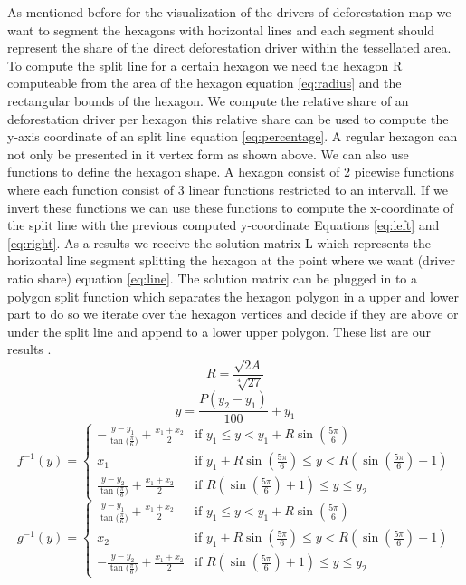 		As mentioned before for the visualization of the drivers of deforestation map we want to segment the hexagons with horizontal lines and each segment should represent the share of the direct deforestation driver within the tessellated area. To compute the split line for a certain hexagon we need the hexagon R computeable from the area of the hexagon equation \ref{eq:radius} and the rectangular bounds of the hexagon. We compute the relative share of an deforestation driver per hexagon this relative share can be used to compute the y-axis coordinate of an split line equation \ref{eq:percentage}. A regular hexagon can not only be presented in it vertex form as shown above. We can also use functions to define the hexagon shape. A hexagon consist of 2 picewise functions where each function consist of 3 linear functions restricted to an intervall. If we invert these functions we can use these functions to compute the x-coordinate of the split line with the previous computed y-coordinate Equations \ref{eq:left} and \ref{eq:right}. As a results we receive the solution matrix L which represents the horizontal line segment splitting the hexagon at the point where we want (driver ratio share) equation \ref{eq:line}. The solution matrix can be plugged in to a polygon split function which separates the hexagon polygon in a upper and lower part to do so we iterate over the hexagon vertices and decide if they are above or under the split line and append to a lower upper polygon. These list are our results .
		\begin{equation}
		\label{eq:radius}
			R = \frac{\sqrt{2A}}{\sqrt[4]{27}}
		\end{equation}
		\begin{equation}
		\label{eq:percentage}
			y = \frac{P(y_2-y_1)}{100} + y_1
		\end{equation}
		\begin{equation}
		\label{eq:left}
			f^{-1}(y) =
			\begin{cases} 
				-\frac{y - y_1}{\tan{(\frac{\pi}{6}})} + \frac{x_1 + x_2}{2} & \text{if } y_1 \le y < y_1 + R\sin{(\frac{5\pi}{6})} \\
				x_1 & \text{if } y_1 + R\sin{(\frac{5\pi}{6})} \le y < R(\sin{(\frac{5\pi}{6})} + 1) \\
				\frac{y - y_2}{\tan{(\frac{\pi}{6}})} + \frac{x_1 + x_2}{2} & \text{if } R(\sin{(\frac{5\pi}{6})} + 1) \le y \le y_2
			\end{cases}
		\end{equation}
		\begin{equation}
		\label{eq:right}
			g^{-1}(y) = 
			\begin{cases} 
				\frac{y - y_1}{\tan{(\frac{\pi}{6}})} + \frac{x_1 + x_2}{2} & \text{if } y_1 \le y < y_1 + R\sin{(\frac{5\pi}{6})} \\
				x_2 & \text{if } y_1 + R\sin{(\frac{5\pi}{6})} \le y < R(\sin{(\frac{5\pi}{6})} + 1) \\
				-\frac{y - y_2}{\tan{(\frac{\pi}{6}})} + \frac{x_1 + x_2}{2} & \text{if } R(\sin{(\frac{5\pi}{6})} + 1) \le y \le y_2
			\end{cases}
		\end{equation}
